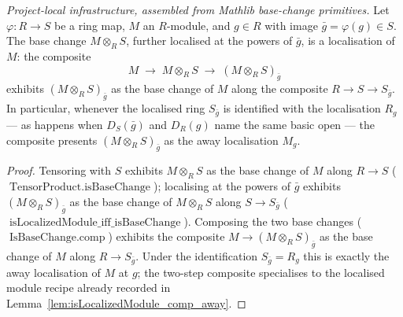 \begin{lemma}
  \label{lem:isLocalizedModule_baseChange_away}
  \textit{Project-local infrastructure, assembled from Mathlib base-change primitives.}
  Let \(\varphi : R \to S\) be a ring map, \(M\) an \(R\)-module, and \(g \in R\) with image
  \(\bar g = \varphi(g) \in S\). The base change \(M \otimes_R S\), further localised at the powers of
  \(\bar g\), is a localisation of \(M\): the composite
  \[
    M \;\longrightarrow\; M \otimes_R S \;\longrightarrow\; (M \otimes_R S)_{\bar g}
  \]
  exhibits \((M \otimes_R S)_{\bar g}\) as the base change of \(M\) along the composite
  \(R \to S \to S_{\bar g}\). In particular, whenever the localised ring \(S_{\bar g}\) is identified
  with the localisation \(R_g\) --- as happens when \(D_S(\bar g)\) and \(D_R(g)\) name the same basic
  open --- the composite presents \((M \otimes_R S)_{\bar g}\) as the away localisation \(M_g\).
\end{lemma}
\begin{proof}
  \leanok
  Tensoring with \(S\) exhibits \(M \otimes_R S\) as the base change of \(M\) along \(R \to S\)
  (\(\operatorname{TensorProduct.isBaseChange}\)); localising at the powers of \(\bar g\) exhibits
  \((M \otimes_R S)_{\bar g}\) as the base change of \(M \otimes_R S\) along \(S \to S_{\bar g}\)
  (\(\operatorname{isLocalizedModule\_iff\_isBaseChange}\)). Composing the two base changes
  (\(\operatorname{IsBaseChange.comp}\)) exhibits the composite \(M \to (M \otimes_R S)_{\bar g}\) as the
  base change of \(M\) along \(R \to S_{\bar g}\). Under the identification \(S_{\bar g} = R_g\) this is
  exactly the away localisation of \(M\) at \(g\); the two-step composite specialises to the localised
  module recipe already recorded in Lemma~\ref{lem:isLocalizedModule_comp_away}.
\end{proof}

